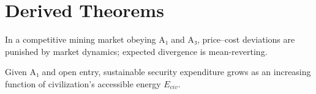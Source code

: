 \section{Derived Theorems}

\begin{theorem}
In a competitive mining market obeying A₁ and A₃, price–cost deviations are punished by market dynamics; expected divergence is mean-reverting.
\end{theorem}

\begin{theorem}
Given A₁ and open entry, sustainable security expenditure grows as an increasing function of civilization’s accessible energy $E_{civ}$.
\end{theorem}